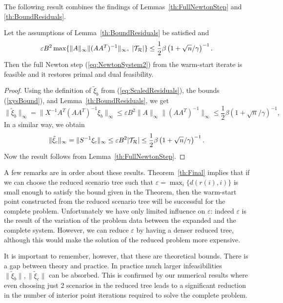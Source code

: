 The following result combines the findings of Lemmas~\ref{th:FullNewtonStep} 
and \ref{th:BoundResiduals}. 
%
\begin{theorem}  \label{th:Final}
Let the assumptions of Lemma~\ref{th:BoundResiduals} be satisfied and 
\[
\varepsilon B^2 \max\{\|A\|_\infty\|(AA^T)^{-1}\|_\infty, \; |\mathcal{T}_\mathcal{R}|\} 
   \le \frac{1}{2} \beta \left(1+\sqrt{n} / \gamma \right)^{-1}.
\]
Then the full Newton step (\ref{eq:NewtonSystem2})
from the warm-start iterate is feasible 
and it restores primal and dual feasibility.
\end{theorem}
%
\begin{proof}
Using the definition of $\tilde{\xi}_b$ from (\ref{eq:ScaledResiduals}),
the bounds (\ref{xysBound}), and Lemma~\ref{th:BoundResiduals}, we get
\[
\| \tilde{\xi}_b \|_{\infty} = \| X^{-1} A^T (AA^T)^{-1} \xi_b \|_{\infty} 
    \le
    \varepsilon B^2 \|A\|_{\infty} \|(AA^T)^{-1}\|_{\infty} 
    \le \frac{1}{2} \beta \left(1+\sqrt{n} / \gamma \right)^{-1},
\]
In a similar way, we obtain
\[
  \| \tilde{\xi}_c \|_{\infty} = \| S^{-1} \xi_c \|_\infty
                  \le \varepsilon B^2 |\mathcal{T}_\mathcal{R}|
                  \le \frac{1}{2} \beta \left(1+\sqrt{n} / \gamma \right)^{-1}.
 \]
Now the result follows from  Lemma~\ref{th:FullNewtonStep}. 
\end{proof}

A few remarks are in order about these results.
Theorem~\ref{th:Final} implies that if we can choose the reduced
scenario tree such that $\varepsilon = \max_i\{d(r(i),i)\}$ is small enough
to satisfy the bound given in the Theorem, then the warm-start point
constructed from the reduced scenario tree will be successful for the
complete problem. Unfortunately we have only limited influence on
$\varepsilon$: indeed $\varepsilon$ is the result of the variation of
the problem data between the expanded and the complete system.
However, we can reduce $\varepsilon$ by having a
denser reduced tree, although this would make the solution of the
reduced problem more expensive.


It is important to remember, however,
that these are theoretical bounds. There is a gap between theory and
practice. In practice much larger infeasibilities 
$\|\tilde{\xi}_b\|, \|\tilde{\xi}_c\|$ can be absorbed. This is
confirmed by our numerical results where even choosing just 2
scenarios in the reduced tree leads to a significant reduction in the
number of interior point iterations required to solve the complete problem.


